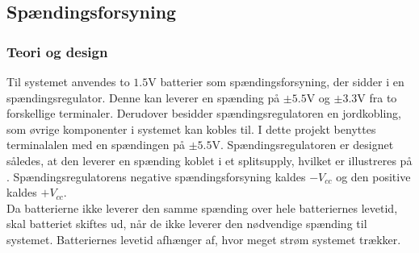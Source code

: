 \subsection{Spændingsforsyning}
\subsubsection{Teori og design}
Til systemet anvendes to $1.5$V batterier som spændingsforsyning, der sidder i en spændingsregulator. Denne kan leverer en spænding på $\pm5.5$V og $\pm3.3$V fra to forskellige terminaler. Derudover besidder spændingsregulatoren en jordkobling, som øvrige komponenter i systemet kan kobles til. I dette projekt benyttes terminalalen med en spændingen på $\pm5.5$V. Spændingsregulatoren er designet således, at den leverer en spænding koblet i et splitsupply, hvilket er illustreres på . Spændingsregulatorens negative spændingsforsyning kaldes $-V_{cc}$ og den positive kaldes $+V_{cc}$. \\%
Da batterierne ikke leverer den samme spænding over hele batteriernes levetid, skal batteriet skiftes ud, når de ikke leverer den nødvendige spænding til systemet. Batteriernes levetid afhænger af, hvor meget strøm systemet trækker. %

